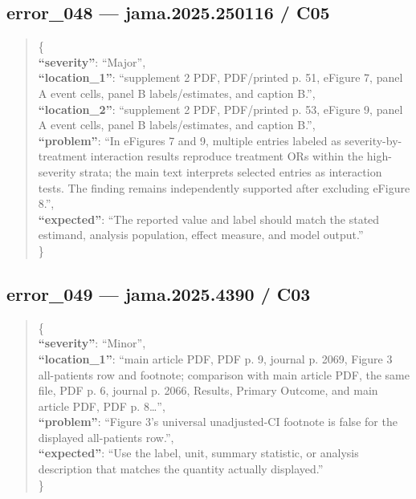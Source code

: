 \documentclass[
  letterpaper,
  9pt]{extreport}
\begin{document}
\hypertarget{error_048--jama2025250116--c05}{%
\subsection{error\_048 --- jama.2025.250116 /
C05}\label{error_048--jama2025250116--c05}}

\begin{quote}
\{\\
\textbf{``severity''}: ``Major'',\\
\textbf{``location\_1''}: ``supplement 2 PDF, PDF/printed p. 51, eFigure
7, panel A event cells, panel B labels/estimates, and caption B.'',\\
\textbf{``location\_2''}: ``supplement 2 PDF, PDF/printed p. 53, eFigure
9, panel A event cells, panel B labels/estimates, and caption B.'',\\
\textbf{``problem''}: ``In eFigures 7 and 9, multiple entries labeled as
severity-by-treatment interaction results reproduce treatment ORs within
the high-severity strata; the main text interprets selected entries as
interaction tests. The finding remains independently supported after
excluding eFigure 8.'',\\
\textbf{``expected''}: ``The reported value and label should match the
stated estimand, analysis population, effect measure, and model
output.''\\
\}
\end{quote}

\hypertarget{error_049--jama20254390--c03}{%
\subsection{error\_049 --- jama.2025.4390 /
C03}\label{error_049--jama20254390--c03}}

\begin{quote}
\{\\
\textbf{``severity''}: ``Minor'',\\
\textbf{``location\_1''}: ``main article PDF, PDF p. 9, journal p. 2069,
Figure 3 all-patients row and footnote; comparison with main article
PDF, the same file, PDF p. 6, journal p. 2066, Results, Primary Outcome,
and main article PDF, PDF p. 8\ldots{}'',\\
\textbf{``problem''}: ``Figure 3's universal unadjusted-CI footnote is
false for the displayed all-patients row.'',\\
\textbf{``expected''}: ``Use the label, unit, summary statistic, or
analysis description that matches the quantity actually displayed.''\\
\}
\end{quote}
\end{document}
